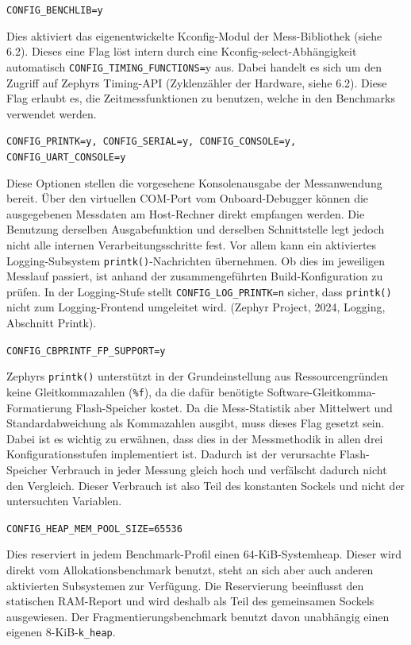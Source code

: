\lstinline[style=codeinline]|CONFIG_BENCHLIB=y|

Dies aktiviert das eigenentwickelte Kconfig-Modul der Mess-Bibliothek (siehe 6.2). Dieses eine Flag l{\"o}st intern durch eine Kconfig-select-Abh{\"a}ngigkeit automatisch \lstinline[style=codeinline]|CONFIG_TIMING_FUNCTIONS=|y aus. Dabei handelt es sich um den Zugriff auf Zephyrs Timing-API (Zyklenz{\"a}hler der Hardware, siehe 6.2). Diese Flag erlaubt es, die Zeitmessfunktionen zu benutzen, welche in den Benchmarks verwendet werden.

\lstinline[style=codeinline]|CONFIG_PRINTK=y, CONFIG_SERIAL=y, CONFIG_CONSOLE=y, CONFIG_UART_CONSOLE=y|

Diese Optionen stellen die vorgesehene Konsolenausgabe der Messanwendung bereit. {\"U}ber den virtuellen COM-Port vom Onboard-Debugger k{\"o}nnen die ausgegebenen Messdaten am Host-Rechner direkt empfangen werden. Die Benutzung derselben Ausgabefunktion und derselben Schnittstelle legt jedoch nicht alle internen Verarbeitungsschritte fest. Vor allem kann ein aktiviertes Logging-Subsystem \lstinline[style=codeinline]|printk()|-Nachrichten {\"u}bernehmen. Ob dies im jeweiligen Messlauf passiert, ist anhand der zusammengef{\"u}hrten Build-Konfiguration zu pr{\"u}fen. In der Logging-Stufe stellt \lstinline[style=codeinline]|CONFIG_LOG_PRINTK=n| sicher, dass \lstinline[style=codeinline]|printk()| nicht zum Logging-Frontend umgeleitet wird. (Zephyr Project, 2024, \glqq{}Logging\grqq{}, Abschnitt \glqq{}Printk\grqq{}).

\lstinline[style=codeinline]|CONFIG_CBPRINTF_FP_SUPPORT=y|

Zephyrs \lstinline[style=codeinline]|printk()| unterst{\"u}tzt in der Grundeinstellung aus Ressourcengr{\"u}nden keine Gleitkommazahlen (\lstinline[style=codeinline]|%f|), da die daf{\"u}r ben{\"o}tigte Software-Gleitkomma-Formatierung Flash-Speicher kostet. Da die Mess-Statistik aber Mittelwert und Standardabweichung als Kommazahlen ausgibt, muss dieses Flag gesetzt sein. Dabei ist es wichtig zu erw{\"a}hnen, dass dies in der Messmethodik in allen drei Konfigurationsstufen implementiert ist. Dadurch ist der verursachte Flash-Speicher Verbrauch in jeder Messung gleich hoch und verf{\"a}lscht dadurch nicht den Vergleich. Dieser Verbrauch ist also Teil des konstanten Sockels und nicht der untersuchten Variablen.

\lstinline[style=codeinline]|CONFIG_HEAP_MEM_POOL_SIZE=65536|

Dies reserviert in jedem Benchmark-Profil einen 64-KiB-Systemheap. Dieser wird direkt vom Allokationsbenchmark benutzt, steht an sich aber auch anderen aktivierten Subsystemen zur Verf{\"u}gung. Die Reservierung beeinflusst den statischen RAM-Report und wird deshalb als Teil des gemeinsamen Sockels ausgewiesen. Der Fragmentierungsbenchmark benutzt davon unabh{\"a}ngig einen eigenen 8-KiB-\lstinline[style=codeinline]|k_heap|.

